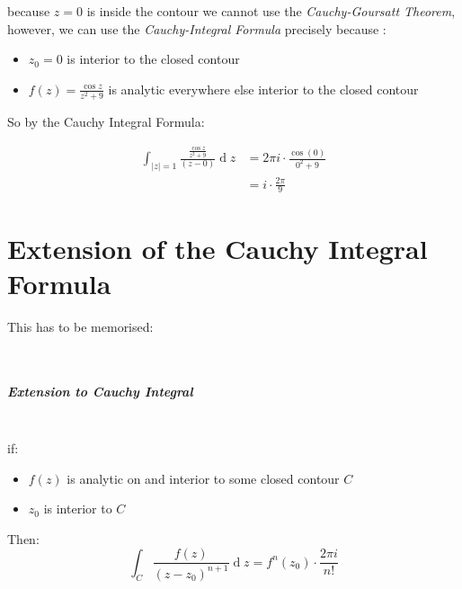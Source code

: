 \documentclass[class=article, crop=false]{standalone}
\begin{document}
because \(z = 0\) is inside the contour we cannot use the
\emph{Cauchy-Goursatt Theorem}, however, we can use the
\emph{Cauchy-Integral Formula} precisely because :

\begin{itemize}
\item
  \(z_0 = 0\) is interior to the closed contour
\item
  \(f\left( z \right) = \frac{\cos{z}}{z^2+ 9}\) is analytic everywhere
  else interior to the closed contour
\end{itemize}

So by the Cauchy Integral Formula:

\[\begin{aligned}
    \int^{}_{    \left| z \right| = 1} \frac{\frac{\cos{z}}{z^2+ 9}}{\left( z- 0 \right) }  \operatorname{d}z &= 2\pi i \cdot \frac{\cos{\left( 0 \right) }}{0^2+ 9} \\
    &= i\cdot \frac{2\pi}{9}\end{aligned}\]

\hypertarget{extension-of-the-cauchy-integral-formula}{%
\section{Extension of the Cauchy Integral
Formula}\label{extension-of-the-cauchy-integral-formula}}

This has to be memorised:

~~

\hypertarget{extension-to-cauchy-integral}{%
\subparagraph{Extension to Cauchy
Integral}\label{extension-to-cauchy-integral}}

~\\
if:

\begin{itemize}
\item
  \(f\left( z \right)\) is analytic on and interior to some closed
  contour \(C\)
\item
  \(z_0\) is interior to \(C\)
\end{itemize}

Then:
\[\int^{}_{C} \frac{f\left( z \right) }{\left( z- z_0 \right) ^{n+ 1}}  \operatorname{d}z = f^{n}\left( z_0 \right) \cdot \frac{2\pi i}{n!}\]
\end{document}

